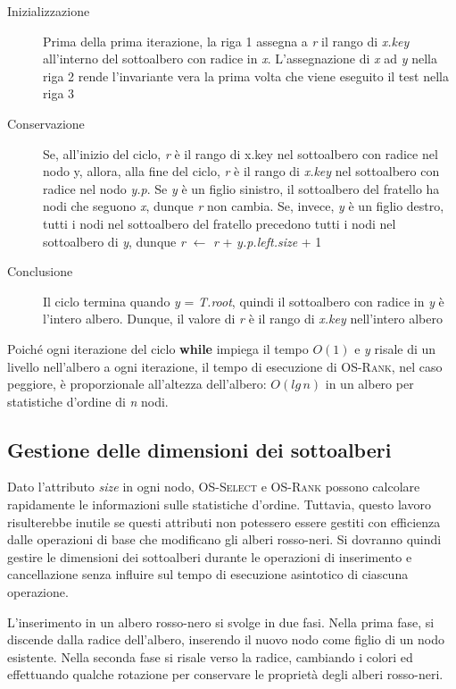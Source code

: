 \documentclass[10pt, a4paper]{report}
\begin{document}
\begin{description}
\item[Inizializzazione]Prima della prima iterazione, la riga 1 assegna a \textit{r} il rango di \textit{x.key} all'interno del sottoalbero con radice in \textit{x}. L'assegnazione di \textit{x} ad \textit{y} nella riga 2 rende l'invariante vera la prima volta che viene eseguito il test nella riga 3
\item[Conservazione]Se, all'inizio del ciclo, \textit{r} è il rango di x.key nel sottoalbero con radice nel nodo y, allora, alla fine del ciclo, \textit{r} è il rango di \textit{x.key} nel sottoalbero con radice nel nodo \textit{y.p}. Se \textit{y} è un figlio sinistro, il sottoalbero del fratello ha nodi che seguono \textit{x}, dunque \textit{r} non cambia. Se, invece, \textit{y} è un figlio destro, tutti i nodi nel sottoalbero del fratello precedono tutti i nodi nel sottoalbero di \textit{y}, dunque \textit{r} $\leftarrow$ \textit{r} + \textit{y.p.left.size} + 1
\item[Conclusione]Il ciclo termina quando \textit{y} = \textit{T.root}, quindi il sottoalbero con radice in \textit{y} è l'intero albero. Dunque, il valore di \textit{r} è il rango di \textit{x.key} nell'intero albero
\end{description}
Poiché ogni iterazione del ciclo \textbf{while} impiega il tempo $O(1)$ e \textit{y} risale di un livello nell'albero a ogni iterazione, il tempo di esecuzione di \textsc{OS-Rank}, nel caso peggiore, è proporzionale all'altezza dell'albero: $O(lg\,n)$ in un albero per statistiche d'ordine di \textit{n} nodi.
\subsection{Gestione delle dimensioni dei sottoalberi}
Dato l'attributo \textit{size} in ogni nodo, \textsc{OS-Select} e \textsc{OS-Rank} possono calcolare rapidamente le informazioni sulle statistiche d'ordine. Tuttavia, questo lavoro risulterebbe inutile se questi attributi non potessero essere gestiti con efficienza dalle operazioni di base che modificano gli alberi rosso-neri. Si dovranno quindi gestire le dimensioni dei sottoalberi durante le operazioni di inserimento e cancellazione senza influire sul tempo di esecuzione asintotico di ciascuna operazione.

L'inserimento in un albero rosso-nero si svolge in due fasi. Nella prima fase, si discende dalla radice dell'albero, inserendo il nuovo nodo come figlio di un nodo esistente. Nella seconda fase si risale verso la radice, cambiando i colori ed effettuando qualche rotazione per conservare le proprietà degli alberi rosso-neri. 
\end{document}
